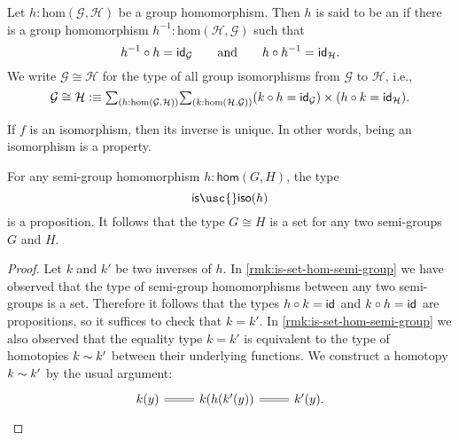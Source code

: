 \begin{defn}
Let $h:\mathrm{hom}(\mathcal{G},\mathcal{H})$ be a group homomorphism. Then $h$ is said to be an  if there is a group homomorphism $h^{-1}:\mathrm{hom}(\mathcal{H},\mathcal{G})$ such that
\begin{equation*}
h^{-1}\circ h=\idfunc[\mathcal{G}]\qquad\text{and}\qquad h\circ h^{-1}=\idfunc[\mathcal{H}].
\end{equation*}
We write $\mathcal{G}\cong\mathcal{H}$ for the type of all group isomorphisms from $\mathcal{G}$ to $\mathcal{H}$, i.e.,
\begin{equation*}
\mathcal{G}\cong\mathcal{H} \defeq \sm{h:\mathrm{hom}(\mathcal{G},\mathcal{H})}{k:\mathrm{hom}(\mathcal{H},\mathcal{G})} (k\circ h = \idfunc[\mathcal{G}])\times (h\circ k=\idfunc[\mathcal{H}]).
\end{equation*}
\end{defn}

If $f$ is an isomorphism, then its inverse is unique. In other words, being an isomorphism is a property.

\begin{lem}
  For any semi-group homomorphism $h:\mathsf{hom}(G,H)$, the type
  \begin{equation*}
    \mathsf{is\usc{}iso}(h)
  \end{equation*}
  is a proposition. It follows that the type $G\cong H$ is a set for any two semi-groups $G$ and $H$.
\end{lem}

\begin{proof}
  Let $k$ and $k'$ be two inverses of $h$. In \cref{rmk:is-set-hom-semi-group} we have observed that the type of semi-group homomorphisms between any two semi-groups is a set. Therefore it follows that the types $h\circ k=\idfunc$ and $k\circ h=\idfunc$ are propositions, so it suffices to check that $k=k'$. In \cref{rmk:is-set-hom-semi-group} we also observed that the equality type $k=k'$ is equivalent to the type of homotopies $k\htpy k'$ between their underlying functions. We construct a homotopy $k\htpy k'$ by the usual argument:
  \begin{equation*}
    \begin{tikzcd}
      k(y) \arrow[r,equals] & k(h(k'(y)) \arrow[r,equals] & k'(y).
    \end{tikzcd}\qedhere
  \end{equation*}
\end{proof}

